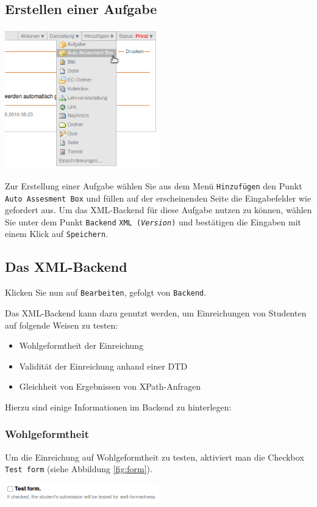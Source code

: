 \documentclass[a4paper]{scrartcl}
\newcommand{\anf}[1]{\glqq{}#1\grqq{}}
\begin{document}
	  \subsection{Erstellen einer Aufgabe}
	  \begin{center}
        \captionsetup{type=figure}
	    \includegraphics[width=0.50\textwidth]{images/AddingECAAB.png}
	    \label{fig:ecaab}
    \end{center}
	  Zur Erstellung einer Aufgabe wählen Sie aus dem Menü \anf{\texttt{Hinzufügen}} den Punkt \anf{\texttt{Auto Assesment Box}} und füllen auf der erscheinenden Seite die Eingabefelder wie gefordert aus.
	  Um das XML-Backend für diese Aufgabe nutzen zu können, wählen Sie unter dem Punkt \anf{\texttt{Backend}} \anf{\texttt{XML (\textit{Version})}} und bestätigen die Eingaben mit einem Klick auf \anf{\texttt{Speichern}}.
	  \subsection{Das XML-Backend}
	  Klicken Sie nun auf \anf{\texttt{Bearbeiten}}, gefolgt von \anf{\texttt{Backend}}.
	  
	  Das XML-Backend kann dazu genutzt werden, um Einreichungen von Studenten auf folgende Weisen zu testen:
	  \begin{itemize}
	    \item Wohlgeformtheit der Einreichung
	    \item Validität der Einreichung anhand einer DTD
	    \item Gleichheit von Ergebnissen von XPath-Anfragen
	  \end{itemize}
	  Hierzu sind einige Informationen im Backend zu hinterlegen:
  	  \subsubsection{Wohlgeformtheit}
  	  Um die Einreichung auf Wohlgeformtheit zu testen, aktiviert man die Checkbox \anf{\texttt{Test form}} (siehe Abbildung \ref{fig:form}).
  	  \begin{center}
        \captionsetup{type=figure}
	      \includegraphics[width=0.50\textwidth]{images/Form.png}
	      \label{fig:form}
      \end{center}
      
\end{document}
